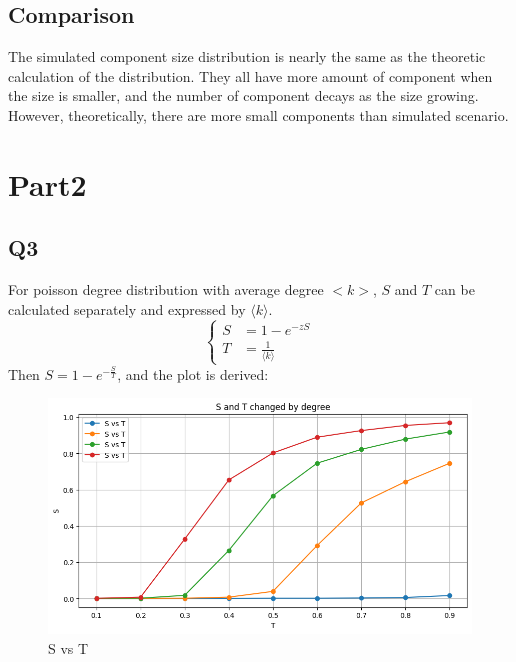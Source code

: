\documentclass{article}
\begin{document}
	\subsection*{Comparison}
	The simulated component size distribution is nearly the same as the theoretic calculation of the distribution. They all have more amount of component when the size is smaller, and the number of component decays as the size growing. However, theoretically, there are more small components than simulated scenario. 
	
	\section*{Part2}
	\subsection*{Q3}
	For poisson degree distribution with average degree $<k>$, $S$ and $T$ can be calculated separately and expressed by $\langle k \rangle$.
	\[
	\left\{
	\begin{aligned}
		S &= 1 - e^{-zS} \\
		T &= \frac{1}{\langle k \rangle}
	\end{aligned}
	\right.
	\]
	Then $S = 1 - e^{-\frac{S}{T}}$, and the plot is derived:
	\begin{figure}[H]
		\centering
		\includegraphics[scale=0.5]{P2Q3.png}
		\caption{S vs T}
	\end{figure}
	
\end{document}
